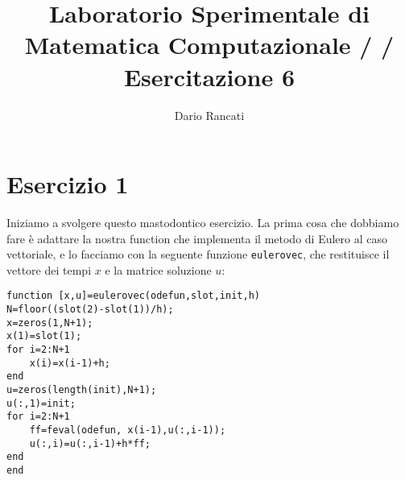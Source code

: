 \documentclass{article}
\title{\textbf{Laboratorio Sperimentale di Matematica Computazionale / / Esercitazione 6}}
\author{Dario Rancati}
\begin{document}
\section*{Esercizio 1}

Iniziamo a svolgere questo mastodontico esercizio. La prima cosa che dobbiamo fare è adattare la nostra function che implementa il metodo di Eulero al caso vettoriale, e lo facciamo con la seguente funzione \texttt{eulerovec}, che restituisce il vettore dei tempi $x$ e la matrice soluzione $u$:
\begin{lstlisting}
function [x,u]=eulerovec(odefun,slot,init,h)
N=floor((slot(2)-slot(1))/h);
x=zeros(1,N+1);
x(1)=slot(1);
for i=2:N+1
    x(i)=x(i-1)+h;
end
u=zeros(length(init),N+1);
u(:,1)=init;
for i=2:N+1
    ff=feval(odefun, x(i-1),u(:,i-1));
    u(:,i)=u(:,i-1)+h*ff;
end
end
\end{lstlisting}
\end{document}
